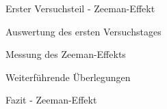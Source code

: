 \documentclass[pdftex, a4paper,11pt, twoside, ngerman]{report}
\begin{document}
\begin{chapter}{Erster Versuchsteil - Zeeman-Effekt}
\begin{section}{Auswertung des ersten Versuchstages}
\begin{subsection}{Messung des Zeeman-Effekts}
      \end{subsection}
      
      
      
      \begin{subsection}{Weiterführende Überlegungen}
        \label{chp:Zeeman:sec:AuswertungWeiteres}
        
        
        
      \end{subsection}
      
    \end{section}
    
    
    
    \begin{section}{Fazit - Zeeman-Effekt}
      \label{chp:ZeemanEffekt:sec:Fazit}
      
      
      
    \end{section}
    
  \end{chapter}
  
  
  
\end{document}
